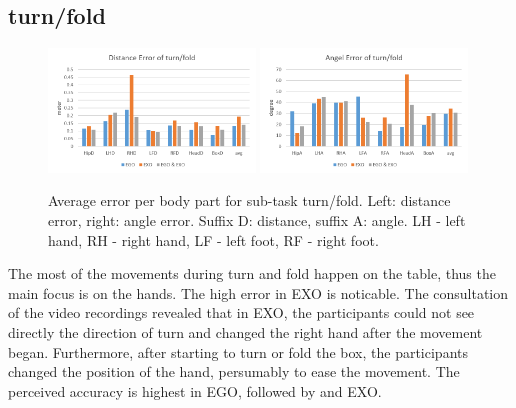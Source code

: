 \subsection{turn/fold}
\begin{figure}[H]
	\centering
	\includegraphics[width=0.49\textwidth]{figures/distanceErrorTurnFold.png}
	\includegraphics[width=0.49\textwidth]{figures/angleErrorTurnFold.png}
	\caption[Average error per body part for sub-task turn/fold.]{Average error per body part for sub-task turn/fold. Left: distance error, right: angle error. Suffix D: distance, suffix A: angle. LH - left hand, RH - right hand, LF - left foot, RF - right foot.}
	\label{fig:errorTurnFold}
\end{figure}
The most of the movements during turn and fold happen on the table, thus the main focus is on the hands. The high error in EXO is noticable. The consultation of the video recordings revealed that in EXO, the participants could not see directly the direction of turn and changed the right hand after the movement began. Furthermore, after starting to turn or fold the box, the participants changed the position of the hand, persumably to ease the movement. The perceived accuracy is highest in EGO, followed by \combi and EXO. 


